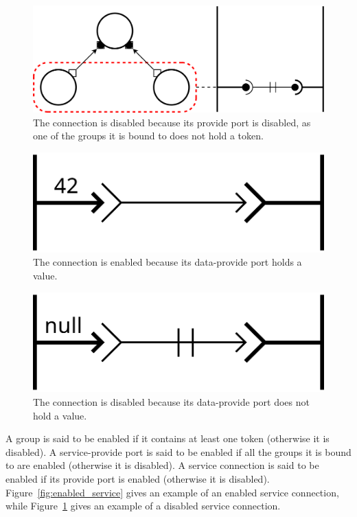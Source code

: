 \begin{figure}[t]
\begin{center}
  \includegraphics[width=0.7\columnwidth]{./images/disabled_service.pdf}
\end{center}
\caption{The connection is disabled because its provide port is disabled, as one of the groups it is bound to does not hold a token.}
\label{fig:disabled_service}
\end{figure}

\begin{figure}[t]
\begin{center}
  \includegraphics[width=0.4\columnwidth]{./images/enabled_data.pdf}
\end{center}
\caption{The connection is enabled because its data-provide port holds a value.}
\label{fig:enabled_data}
\end{figure}

\begin{figure}[t]
\begin{center}
  \includegraphics[width=0.4\columnwidth]{./images/disabled_data.pdf}
\end{center}
\caption{The connection is disabled because its data-provide port does not hold a value.}
\label{fig:disabled_data}
\end{figure}




A group is said to be enabled if it contains at least one token (otherwise
it is disabled). A service-provide port is said to be enabled if all the groups it
is bound to are enabled (otherwise it is disabled). A service connection is said to
be enabled if its provide port is enabled (otherwise it is disabled).
Figure~\ref{fig:enabled_service} gives an example of an enabled service connection,
while Figure~\ref{fig:disabled_service} gives an example of a disabled service connection.

